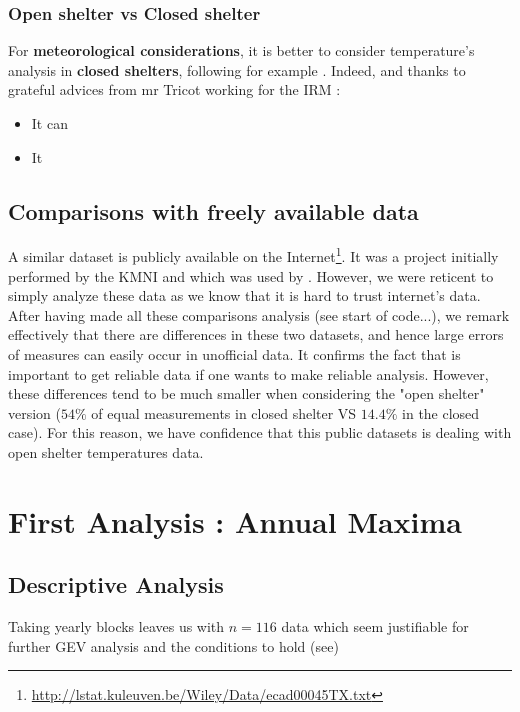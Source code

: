 \subsubsection*{Open shelter vs Closed shelter}

For\textbf{ meteorological considerations}, it is better to consider temperature's analysis in \textbf{closed shelters}, following for example \citet{lindsey_use_1956}. Indeed, and thanks to grateful advices from mr Tricot working for the IRM : 
\begin{itemize}
	\item It can
	\item It
\end{itemize}


\subsection{Comparisons with freely available data} 

A similar dataset is publicly available on the Internet\footnote{\url{http://lstat.kuleuven.be/Wiley/Data/ecad00045TX.txt}}. It was a project initially performed by the KMNI and which was used by \citet{beirlant_statistics_2006}. However, we were reticent to simply analyze these data as we know that it is hard to trust internet's data. After having made all these comparisons analysis (see start of code...), we remark effectively that there are differences
in these two datasets, and hence large errors of measures can easily occur 
in unofficial data. It confirms the fact that is important to get reliable data if one wants to make reliable analysis. 
However, these differences tend to be much smaller when considering the "open shelter"
version ($54\%$ of equal measurements in closed shelter VS $14.4\%$ in the closed case). For this reason, we have confidence that this public datasets
is dealing with open shelter temperatures data.






\section{First Analysis : Annual Maxima}\label{sec:firstana}


\subsection{Descriptive Analysis}

Taking yearly blocks leaves us with $n=116$ data which seem justifiable for further GEV analysis and the conditions to hold (see)

